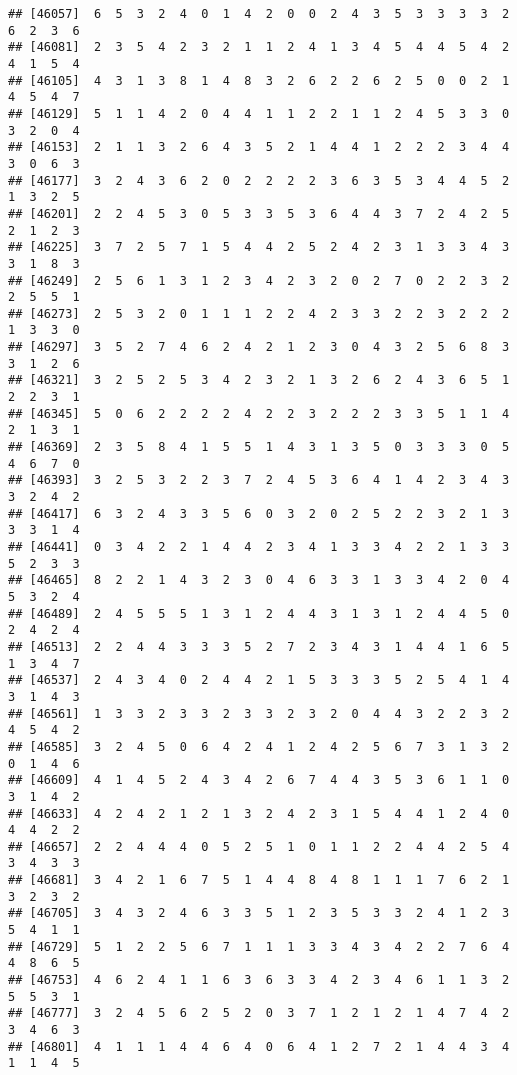 \documentclass[
]{article}
\begin{document}
\begin{verbatim}
## [46057]  6  5  3  2  4  0  1  4  2  0  0  2  4  3  5  3  3  3  3  2  6  2  3  6
## [46081]  2  3  5  4  2  3  2  1  1  2  4  1  3  4  5  4  4  5  4  2  4  1  5  4
## [46105]  4  3  1  3  8  1  4  8  3  2  6  2  2  6  2  5  0  0  2  1  4  5  4  7
## [46129]  5  1  1  4  2  0  4  4  1  1  2  2  1  1  2  4  5  3  3  0  3  2  0  4
## [46153]  2  1  1  3  2  6  4  3  5  2  1  4  4  1  2  2  2  3  4  4  3  0  6  3
## [46177]  3  2  4  3  6  2  0  2  2  2  2  3  6  3  5  3  4  4  5  2  1  3  2  5
## [46201]  2  2  4  5  3  0  5  3  3  5  3  6  4  4  3  7  2  4  2  5  2  1  2  3
## [46225]  3  7  2  5  7  1  5  4  4  2  5  2  4  2  3  1  3  3  4  3  3  1  8  3
## [46249]  2  5  6  1  3  1  2  3  4  2  3  2  0  2  7  0  2  2  3  2  2  5  5  1
## [46273]  2  5  3  2  0  1  1  1  2  2  4  2  3  3  2  2  3  2  2  2  1  3  3  0
## [46297]  3  5  2  7  4  6  2  4  2  1  2  3  0  4  3  2  5  6  8  3  3  1  2  6
## [46321]  3  2  5  2  5  3  4  2  3  2  1  3  2  6  2  4  3  6  5  1  2  2  3  1
## [46345]  5  0  6  2  2  2  2  4  2  2  3  2  2  2  3  3  5  1  1  4  2  1  3  1
## [46369]  2  3  5  8  4  1  5  5  1  4  3  1  3  5  0  3  3  3  0  5  4  6  7  0
## [46393]  3  2  5  3  2  2  3  7  2  4  5  3  6  4  1  4  2  3  4  3  3  2  4  2
## [46417]  6  3  2  4  3  3  5  6  0  3  2  0  2  5  2  2  3  2  1  3  3  3  1  4
## [46441]  0  3  4  2  2  1  4  4  2  3  4  1  3  3  4  2  2  1  3  3  5  2  3  3
## [46465]  8  2  2  1  4  3  2  3  0  4  6  3  3  1  3  3  4  2  0  4  5  3  2  4
## [46489]  2  4  5  5  5  1  3  1  2  4  4  3  1  3  1  2  4  4  5  0  2  4  2  4
## [46513]  2  2  4  4  3  3  3  5  2  7  2  3  4  3  1  4  4  1  6  5  1  3  4  7
## [46537]  2  4  3  4  0  2  4  4  2  1  5  3  3  3  5  2  5  4  1  4  3  1  4  3
## [46561]  1  3  3  2  3  3  2  3  3  2  3  2  0  4  4  3  2  2  3  2  4  5  4  2
## [46585]  3  2  4  5  0  6  4  2  4  1  2  4  2  5  6  7  3  1  3  2  0  1  4  6
## [46609]  4  1  4  5  2  4  3  4  2  6  7  4  4  3  5  3  6  1  1  0  3  1  4  2
## [46633]  4  2  4  2  1  2  1  3  2  4  2  3  1  5  4  4  1  2  4  0  4  4  2  2
## [46657]  2  2  4  4  4  0  5  2  5  1  0  1  1  2  2  4  4  2  5  4  3  4  3  3
## [46681]  3  4  2  1  6  7  5  1  4  4  8  4  8  1  1  1  7  6  2  1  3  2  3  2
## [46705]  3  4  3  2  4  6  3  3  5  1  2  3  5  3  3  2  4  1  2  3  5  4  1  1
## [46729]  5  1  2  2  5  6  7  1  1  1  3  3  4  3  4  2  2  7  6  4  4  8  6  5
## [46753]  4  6  2  4  1  1  6  3  6  3  3  4  2  3  4  6  1  1  3  2  5  5  3  1
## [46777]  3  2  4  5  6  2  5  2  0  3  7  1  2  1  2  1  4  7  4  2  3  4  6  3
## [46801]  4  1  1  1  4  4  6  4  0  6  4  1  2  7  2  1  4  4  3  4  1  1  4  5

\end{verbatim}
\end{document}
